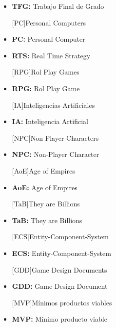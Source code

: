 \begin{itemize}

[TFG]{Trabajos Finales de Grado}
\item \textbf{TFG:} Trabajo Final de Grado

[PC]{Personal Computers}
\item \textbf{PC:} Personal Computer

\item \textbf{RTS:} Real Time Strategy

[RPG]{Rol Play Games}
\item \textbf{RPG:} Rol Play Game

[IA]{Inteligencias Artificiales}
\item \textbf{IA:} Inteligencia Artificial

[NPC]{Non-Player Characters}
\item \textbf{NPC:} Non-Player Character

[AoE]{Age of Empires}
\item \textbf{AoE:} Age of Empires

[TaB]{They are Billions}
\item \textbf{TaB:} They are Billions

[ECS]{Entity-Component-System}
\item \textbf{ECS:} Entity-Component-System

[GDD]{Game Design Documents}
\item \textbf{GDD:} Game Design Document

[MVP]{Mínimos productos viables}
\item \textbf{MVP:} Mínimo producto viable

\end{itemize}